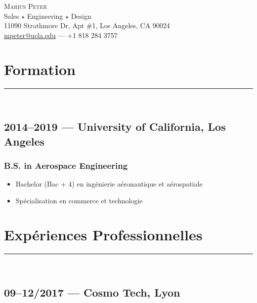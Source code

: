 \documentclass[10pt]{report}
\begin{document}
\centering
\huge \textsc{Marius Peter}\\[0.2cm]
\Large Sales $\star$ Engineering $\star$ Design\\[0.2cm]

\normalsize
11090 Strathmore Dr, Apt \#1,
Los Angeles, CA 90024\\
\href{mailto:mpeter@ucla.edu}{mpeter@ucla.edu} --- +1 818 284 3757\\


\section*{Formation}
\rule{\linewidth}{1pt}\\
\subsection*{2014--2019 --- University of California, Los Angeles}
\subsubsection*{B.S. in Aerospace Engineering}
\begin{itemize}
    \item Bachelor (Bac + 4) en ingénierie aéronautique et aérospatiale
    \item Spécialisation en commerce et technologie
\end{itemize}

\section*{Expériences Professionnelles}
\rule{\linewidth}{1pt}\\
\subsection*{09--12/2017 --- Cosmo Tech, Lyon}
\end{document}
